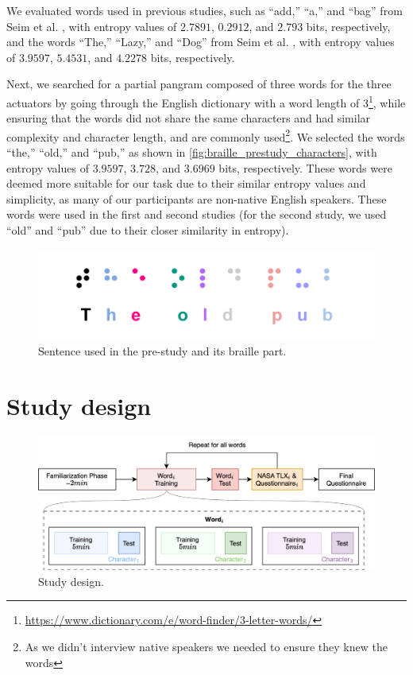 We evaluated words used in previous studies, such as ``add,'' ``a,'' and ``bag'' from Seim et al. \cite{Seim2014a, Seim2014}, with entropy values of \( 2.7891 \), \( 0.2912 \), and \( 2.793 \) bits, respectively, and the words ``The,'' ``Lazy,'' and ``Dog''  from Seim et al. \cite{Seim2018}, with entropy values of \( 3.9597 \), \( 5.4531 \), and \( 4.2278 \) bits, respectively.

Next, we searched for a partial pangram composed of three words for the three actuators by going through the English dictionary with a word length of  3\footnote{\url{https://www.dictionary.com/e/word-finder/3-letter-words/}}, while ensuring that the words did not share the same characters and had similar complexity and character length, and are commonly used\footnote{As we didn't interview native speakers we needed to ensure they knew the words}. 
We selected the words ``the,'' ``old,'' and ``pub,'' as shown in \autoref{fig:braille_prestudy_characters}, with entropy values of \( 3.9597 \), \( 3.728 \), and \( 3.6969 \) bits, respectively. These words were deemed more suitable for our task due to their similar entropy values and simplicity, as many of our participants are non-native English speakers. These words were used in the first and second studies (for the second study, we used ``old'' and ``pub'' due to their closer similarity in entropy).

\begin{figure}
    \centering
    \includegraphics[width=.75\linewidth]{src/pictures/braille_prestudy_characters.drawio.pdf}
    \caption{Sentence used in the pre-study and its braille part.}
    \label{fig:braille_prestudy_characters}
\end{figure}
 











 \section{Study design}

\begin{figure}
    \centering
    \includegraphics[width=0.75\linewidth]{src/pictures/StudyData/Study_design.drawio.png}
    \caption{Study design.}
    \label{fig:study-design}
\end{figure}

